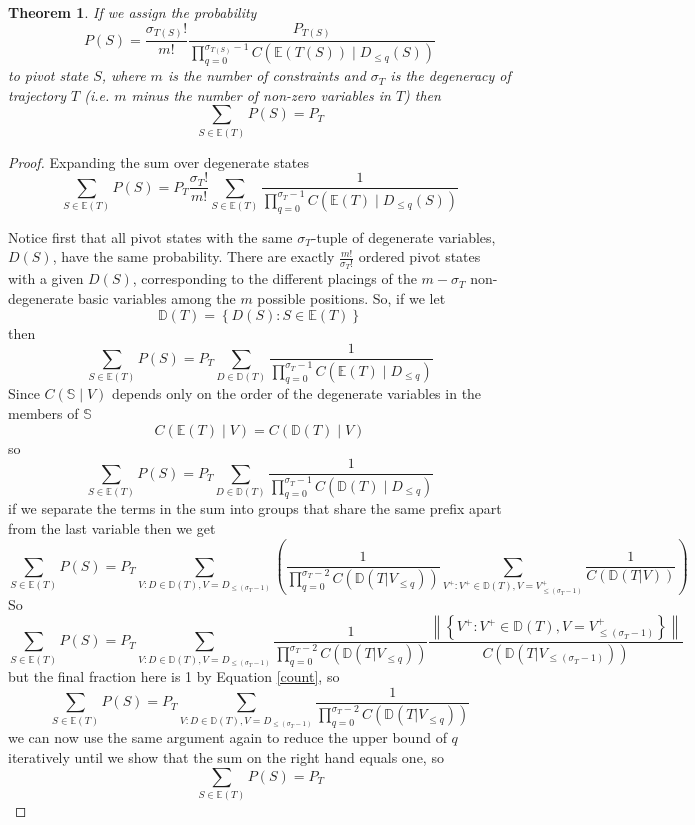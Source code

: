 \documentclass{article}
\newtheorem{theorem}{Theorem}
\begin{document}
\begin{theorem}
	If we assign the probability
	\begin{equation}
	P(S) =  \frac{\sigma_{T(S)}!}{m!} \frac{P_{T(S)}}{\prod_{q=0}^{\sigma_{T(S)}-1} C(\mathbb{E}(T(S)) \mid D_{\le q}(S))}
	\label{pivotProb}
	\end{equation}
	to pivot state $S$, where $m$ is the number of constraints and $\sigma_{T}$ is the degeneracy of trajectory $T$ (i.e. $m$ minus the number of non-zero variables in $T$) then
	\[
	\sum_{S \in \mathbb{E}(T)} P(S) = P_{T}
	\]
\end{theorem}
\begin{proof}
	Expanding the sum over degenerate states
	\[
	\sum_{S \in \mathbb{E}(T)} P(S) =
	P_T \frac{\sigma_T!}{m!} \sum_{S \in \mathbb{E}(T)} \frac{1}{\prod_{q=0}^{\sigma_T-1} C(\mathbb{E}(T) \mid D_{\le q}(S))}
	\]
	
	Notice first that all pivot states with the same $\sigma_T$-tuple of degenerate variables, $D(S)$, have the same probability. There are exactly $\frac{m!}{\sigma_T!}$ ordered pivot states with a given $D(S)$, corresponding to the different placings of the $m-\sigma_T$ non-degenerate basic variables among the $m$ possible positions. So, if we let
	\[
	\mathbb{D}(T) = \left\{ D(S) : S \in \mathbb{E}(T) \right\}
	\]
	then
	\[
	\sum_{S \in \mathbb{E}(T)} P(S) = P_T \sum_{D \in \mathbb{D}(T)} \frac{1}{\prod_{q=0}^{\sigma_T-1} C(\mathbb{E}(T) \mid D_{\le q})}
	\]
	Since $C(\mathbb{S} \mid V)$ depends only on the order of the degenerate variables in the members of $\mathbb{S}$
	\[
	C(\mathbb{E}(T) \mid V) = C(\mathbb{D}(T) \mid V)
	\]
	so
	\begin{equation}
	\sum_{S \in \mathbb{E}(T)} P(S) = P_T \sum_{D \in \mathbb{D}(T)} \frac{1}{\prod_{q=0}^{\sigma_T-1} C(\mathbb{D}(T) \mid D_{\le q})}
	\label{normalForm}
	\end{equation}
	if we separate the terms in the sum into groups that share the same prefix apart from the last variable then we get
	\[
	\sum_{S \in \mathbb{E}(T)} P(S) = 
	P_T \sum_{V : D \in \mathbb{D}(T), V = D_{\le (\sigma_T-1)}} 
	\left(
	\frac{1}{\prod_{q=0}^{\sigma_T-2} C(\mathbb{D}(T|V_{\le q}))}
	\sum_{V^+: V^+ \in \mathbb{D}(T), V = V^+_{\le (\sigma_T-1)}}
	\frac{1}{C(\mathbb{D}(T|V))}
	\right)
	\]
	So
	\[
	\sum_{S \in \mathbb{E}(T)} P(S) = 
	P_T \sum_{V : D \in \mathbb{D}(T), V = D_{\le (\sigma_T-1)}} 
	\frac{1}{\prod_{q=0}^{\sigma_T-2} C(\mathbb{D}(T|V_{\le q}))}
	\frac{\left\|\left\{V^+: V^+ \in \mathbb{D}(T), V = V^+_{\le (\sigma_T-1)}\right\}\right\|}{C(\mathbb{D}(T|V_{\le (\sigma_T-1)}))}
	\]
	but the final fraction here is 1 by Equation \eqref{count}, so
	\[
	\sum_{S \in \mathbb{E}(T)} P(S) = 
	P_T \sum_{V : D \in \mathbb{D}(T), V = D_{\le (\sigma_T-1)}} 
	\frac{1}{\prod_{q=0}^{\sigma_T-2} C(\mathbb{D}(T|V_{\le q}))}
	\]
	we can now use the same argument again to reduce the upper bound of $q$ iteratively until we show that the sum on the right hand equals one, so
	\[
	\sum_{S \in \mathbb{E}(T)} P(S) = P_T
	\]
\end{proof}
\end{document}
